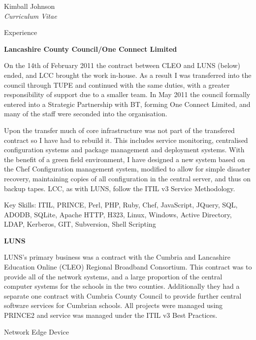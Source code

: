 \documentclass[10pt]{article}
\newenvironment{subbulletlist}{%
	\begin{list}{\labelitemii}{%
		\setlength{\topsep}{\itemsep}\setlength{\parskip}{\parsep}%
	}%
}%
{ \end{list} }
\begin{document}
\begin{cv}{Kimball Johnson\\{\large \itshape Curriculum Vitae}}
\setlength{\oldcvlabelwidth}{\cvlabelwidth}
\setlength{\cvlabelwidth}{1em}
\renewcommand*{\bibindent}{1.5em}

\begin{cvlist}{Experience}
    \item \textbf{Lancashire County Council/One Connect Limited}

    On the 14th of February 2011 the contract between CLEO and LUNS (below)
    ended, and LCC brought the work in-house.  As a result I was transferred into
    the council through TUPE and continued with the same duties, with 
	a greater responsibility of support due to a smaller team.  In May 2011 the council 
	formally entered into a Strategic Partnership with BT, forming One Connect Limited, 
	and many of the staff were seconded into the organisation.
	
	Upon the transfer much of core infrastructure was not part of the transfered contract 
	so I have had to rebuild it.
	This includes service monitoring, centralised configuration systems and 
	package management and deployment systems.  With the benefit of a green field
	environment, I have designed a new system based on the Chef Configuration management
	system, modified to allow for simple disaster recovery, maintaining copies of all
	configuration in the central server, and thus on backup tapes. LCC, as with LUNS,
	follow the ITIL v3 Service Methodology.   
	
	Key Skills: ITIL, PRINCE, Perl, PHP, Ruby, Chef, JavaScript, JQuery, 
	SQL, ADODB, SQLite, Apache HTTP, H323, Linux, Windows, Active Directory, LDAP, 
	Kerberos, GIT, Subversion, Shell Scripting
	
	\item \textbf{LUNS}

    LUNS's primary business was a contract with the Cumbria and Lancashire
    Education Online (CLEO) Regional Broadband Consortium.  This contract was
    to provide all of the network systems, and a large proportion of the
    central computer systems for the schools in the two counties.
    Additionally they had a separate one contract with Cumbria County Council to
    provide further central software services for Cumbrian schools. All projects 
	were managed using PRINCE2 and service was managed under the ITIL v3 Best Practices.
	\begin{subbulletlist}
    \item Network Edge Device


\end{subbulletlist}
\end{cvlist}
\end{cv}
\end{document}
